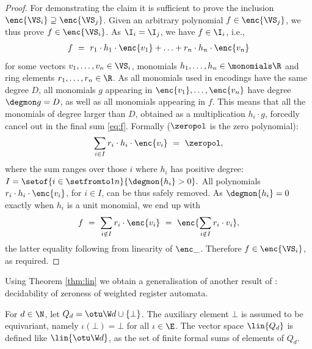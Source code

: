 \begin{proof}
For demonstrating the claim it is sufficient to prove the inclusion
$\enc{\VS_i} \supseteq \enc{\VS_j}$. 
Given an arbitrary polynomial $f \in \enc{\VS_j}$, we thus prove $f\in\enc{\VS_i}$.
As $\I_i = \I_j$, we have $f\in \I_i$, i.e.,
\begin{align} \label{eq:f}
f \ = \ r_1 \cdot h_1 \cdot \enc{v_1} + \ldots + r_n \cdot h_n \cdot \enc{v_n}
\end{align}
for some vectors $v_1, \ldots, v_n \in \VS_i$, monomials
$h_1, \ldots, h_n \in \monomials \R$ and ring elements $r_1, \ldots, r_n \in \R$.
As all monomials used in encodings have the same degree $D$,
all monomials $g$ appearing in
$\enc{v_1}, \ldots, \enc{v_n}$ have degree $\degmon g = D$, as well as all monomials appearing
in $f$.
This means that all the monomials of degree larger than $D$, 
obtained as a multiplication $h_i \cdot g$, forcedly cancel out in the final sum
\eqref{eq:f}.
Formally ($\zeropol$ is the zero polynomial):
\[
\sum_{i\in I} r_i \cdot h_i \cdot \enc{v_i} \ = \ \zeropol,
\]
where the sum ranges over those $i$ where $h_i$ has positive degree:
$
I = \setof{i\in\setfromto 1 n}{\degmon {h_i} > 0}.
$
All polynomials $r_i \cdot h_i \cdot \enc{v_i}$, for $i\in I$, can be thus safely removed.
As $\degmon {h_i} = 0$ exactly when $h_i$ is a unit monomial, we end up with
\[
f \ = \ \sum_{i\notin I} r_i \cdot \enc{v_i} \ = \ \enc{\sum_{i\notin I} r_i \cdot v_i},
\]
the latter equality following from linearity of $\enc \_$.
Therefore $f \in  \enc{\VS_i}$, as required.
\end{proof}


 \label{sec:zeroness}
%
Using Theorem \ref{thm:lin}
we obtain a generalisation
of another result of \cite{BKM21}:
decidability of zeroness of weighted register automata.
%


For $d\in\N$, let $Q_d = \otu \W d \cup\{\bot\}$.
The auxiliary element $\bot$ is assumed to be equivariant, namely 
$\iota(\bot) = \bot$ for all $\iota \in \E$.
The vector space $\lin{Q_d}$ is defined like $\lin{\otu \W d}$, 
as the set of finite formal sums of elements of $Q_d$.

